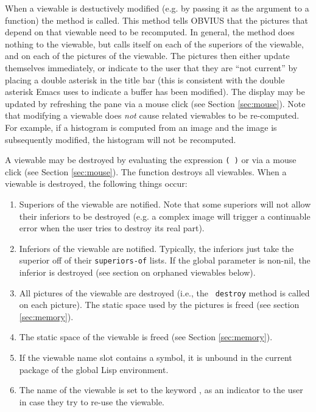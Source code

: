 When a viewable is destuctively modified (e.g. by passing it as the
\lsym{:->} argument to a function) the method  is
called.  This method tells OBVIUS that the pictures that depend on
that viewable need to be recomputed.  In general, the method does
nothing to the viewable, but calls itself on each of the superiors of
the viewable, and on each of the pictures of the viewable.  The
pictures then either update themselves immediately, or indicate to the
user that they are ``not current'' by placing a double asterisk in the
title bar (this is consistent with the double asterisk Emacs uses to
indicate a buffer has been modified).  The display may be updated by
refreshing the pane via a mouse click (see Section
\ref{sec:mouse}).  Note that modifying a viewable does {\em not} cause
related viewables to be re-computed.  For example, if a histogram is
computed from an image and the image is subsequently modified, the
histogram will not be recomputed.


A viewable may be destroyed by evaluating the expression {\tt (
)} or via a mouse click (see Section
\ref{sec:mouse}).  The function  destroys all viewables.
When a viewable is destroyed, the following things occur:
\begin{enumerate}
\item Superiors of the viewable are notified.  Note that some
superiors will not allow their inferiors to be destroyed (e.g. a
complex image will trigger a continuable error when the user tries to
destroy its real part).
 
\item Inferiors of the viewable are notified.  Typically, the
inferiors just take the superior off of their {\tt superiors-of}
lists.  If the global parameter
 is non-nil, the inferior is destroyed
(see section on orphaned viewables below).  

\item All pictures of the viewable are destroyed (i.e., the {\tt
destroy} method is called on each picture).  The static space used by
the pictures is freed (see section \ref{sec:memory}).

\item The static space of the viewable is freed (see Section
\ref{sec:memory}).

\item If the viewable name slot contains a symbol, it is unbound in
the current package of the global Lisp environment.

\item The name of the viewable is set to the keyword
, as an indicator to the user in case they try to
re-use the viewable.
\end{enumerate}


